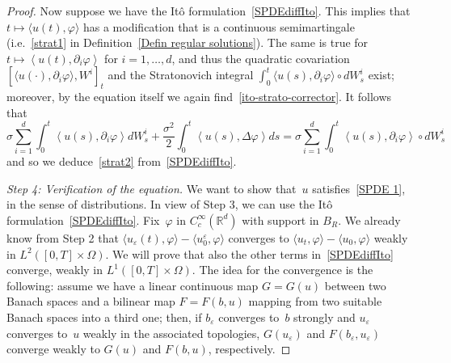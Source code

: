 \documentclass[a4paper,10pt]{article}
\newcommand\1{\mathbbm{1}}
\newcommand{\mr}{\mathbb{R}}
\newcommand{\lan}{\langle}
\newcommand{\ran}{\rangle}
\newcommand{\eps}{\varepsilon}
\numberwithin{equation}{section}
\begin{document}
\begin{proof}
Now suppose we have the It\^o formulation~\eqref{SPDEdiffIto}. This implies that $t\mapsto \langle u(t),\varphi \rangle $ has a modification that is a continuous semimartingale (i.e.~\ref{strat1} in Definition~\ref{Defin regular solutions}). The same is true for $t\mapsto\left\langle u(t),\partial_{i} \varphi\right\rangle $ for $i=1,\ldots,d$, and thus the quadratic covariation $[\langle u(\cdot),\partial_{i}\varphi \rangle ,W^{i}]_{t}$ and the Stratonovich integral $\int_{0}^{t} \langle u(s),\partial_{i}\varphi \rangle \circ dW_{s}^{i}$ exist; moreover, by the equation itself we again find~\eqref{ito-strato-corrector}. It follows that
\begin{equation*}
\sigma\sum_{i=1}^{d}\int_{0}^{t}\left\langle u(  s)  ,\partial
_{i}\varphi\right\rangle dW_{s}^{i}+\frac{\sigma^{2}}{2}\int_{0} 
^{t}\left\langle u(  s)  ,\Delta\varphi\right\rangle
ds=\sigma\sum_{i=1}^{d}\int_{0}^{t}\left\langle u(  s)
,\partial_{i}\varphi\right\rangle \circ dW_{s}^{i}
\end{equation*}
and so we deduce~\ref{strat2} from~\eqref{SPDEdiffIto}.

\emph{Step 4: Verification of the equation.} We want to show that~$u$ satisfies~\eqref{SPDE 1}, in the sense of distributions. In view of Step 3, we can use the It\^o formulation~\eqref{SPDEdiffIto}. Fix~$\varphi$ in $C^\infty_c(\mr^d)$ with support in $B_R$. We already know from Step 2 that $\lan u_\eps(t),\varphi\ran-\lan u^\eps_0,\varphi\ran$ converges to $\lan u_t,\varphi\ran-\lan u_0,\varphi\ran$ weakly in $L^2([0,T]\times\Omega)$. We will prove that also the other terms in~\eqref{SPDEdiffIto} converge, weakly in $L^1([0,T]\times\Omega)$. The idea for the convergence is the following: assume we have a linear continuous map $G=G(u)$ between two Banach spaces and a bilinear map $F=F(b,u)$ mapping from two suitable Banach spaces into a third one; then, if $b_\eps$ converges to~$b$ strongly and $u_\eps$ converges to~$u$ weakly in the associated topologies, $G(u_\eps)$ and $F(b_\eps,u_\eps)$ converge weakly to $G(u)$ and $F(b,u)$, respectively.


\end{proof}
\end{document}
